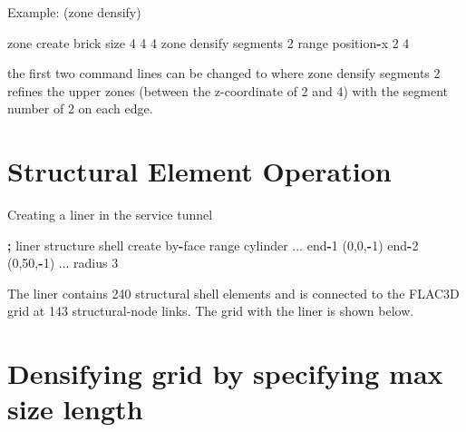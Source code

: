 \documentclass[a4paper, nobind]{templates/ociamthesis}
\newenvironment{Shaded}{\begin{snugshade}}{\end{snugshade}}
\newcommand{\BuiltInTok}[1]{#1}
\newcommand{\DecValTok}[1]{\textcolor[rgb]{0.00,0.00,0.81}{#1}}
\newcommand{\NormalTok}[1]{#1}
\newcommand{\OperatorTok}[1]{\textcolor[rgb]{0.81,0.36,0.00}{\textbf{#1}}}
\renewenvironment{Shaded}
{
  \vspace{10pt}%
  \begin{snugshade}%
}{%
  \end{snugshade}%
  \vspace{8pt}%
}
\begin{document}
Example: (zone densify)

\begin{Shaded}
\begin{Highlighting}[]
\NormalTok{zone create brick size }\DecValTok{4} \DecValTok{4} \DecValTok{4}
\NormalTok{zone densify segments }\DecValTok{2} \BuiltInTok{range}\NormalTok{ position}\OperatorTok{{-}}\NormalTok{x }\DecValTok{2} \DecValTok{4}
\end{Highlighting}
\end{Shaded}

the first two command lines can be changed to
where zone densify segments 2 refines the upper zones (between the z-coordinate of 2 and 4) with the segment number of 2 on each edge.

\hypertarget{structural-element-operation}{%
\section{Structural Element Operation}\label{structural-element-operation}}

Creating a liner in the service tunnel

\begin{Shaded}
\begin{Highlighting}[]
\OperatorTok{;}\NormalTok{ liner}
\NormalTok{structure shell create by}\OperatorTok{{-}}\NormalTok{face }\BuiltInTok{range}\NormalTok{ cylinder ...}
\NormalTok{                                     end}\OperatorTok{{-}}\DecValTok{1}\NormalTok{ (}\DecValTok{0}\NormalTok{,}\DecValTok{0}\NormalTok{,}\OperatorTok{{-}}\DecValTok{1}\NormalTok{) end}\OperatorTok{{-}}\DecValTok{2}\NormalTok{ (}\DecValTok{0}\NormalTok{,}\DecValTok{50}\NormalTok{,}\OperatorTok{{-}}\DecValTok{1}\NormalTok{) ...}
\NormalTok{                                     radius }\DecValTok{3}
\end{Highlighting}
\end{Shaded}

The liner contains 240 structural shell elements and is connected to the FLAC3D grid at 143 structural-node links. The grid with the liner is shown below.

\hypertarget{densifying-grid-by-specifying-max-size-length}{%
\section{Densifying grid by specifying max size length}\label{densifying-grid-by-specifying-max-size-length}}
\end{document}
